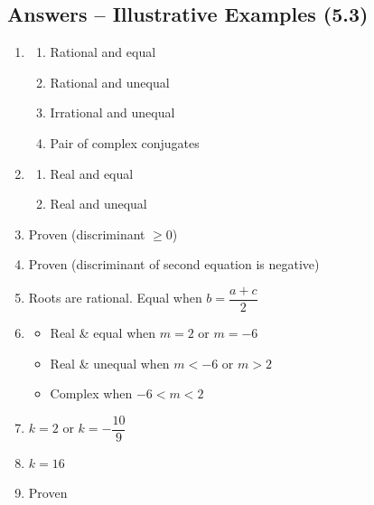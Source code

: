 \documentclass[12pt,a4paper]{article}
\begin{document}
\subsection{Answers -- Illustrative Examples (5.3)}

\begin{enumerate}[label=Example \arabic*.]
    \item 
    \begin{enumerate}[label=(\roman*)]
        \item Rational and equal
        \item Rational and unequal
        \item Irrational and unequal
        \item Pair of complex conjugates
    \end{enumerate}

    \item 
    \begin{enumerate}[label=(\roman*)]
        \item Real and equal
        \item Real and unequal
    \end{enumerate}

    \item Proven (discriminant \( \geq 0 \))

    \item Proven (discriminant of second equation is negative)

    \item Roots are rational. Equal when \( b = \dfrac{a + c}{2} \)

    \item 
    \begin{itemize}
        \item Real \& equal when \( m = 2 \) or \( m = -6 \)
        \item Real \& unequal when \( m < -6 \) or \( m > 2 \)
        \item Complex when \( -6 < m < 2 \)
    \end{itemize}

    \item \( k = 2 \) or \( k = -\dfrac{10}{9} \)

    \item \( k = 16 \)

    \item Proven
\end{enumerate}

\end{document}

